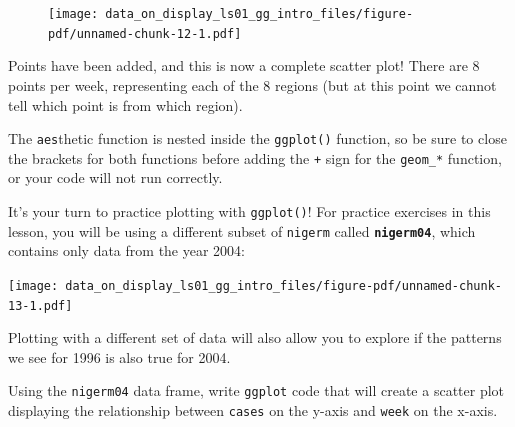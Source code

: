 \documentclass[
  letterpaper,
  DIV=11,
  numbers=noendperiod]{scrreprt}
\begin{document}
\begin{figure}[H]

{\centering \texttt{[image: data\_on\_display\_ls01\_gg\_intro\_files/figure-pdf/unnamed-chunk-12-1.pdf]}

}

\end{figure}

Points have been added, and this is now a complete scatter plot! There
are 8 points per week, representing each of the 8 regions (but at this
point we cannot tell which point is from which region).

\begin{tcolorbox}[enhanced jigsaw, colframe=quarto-callout-note-color-frame, rightrule=.15mm, opacityback=0, breakable, coltitle=black, colbacktitle=quarto-callout-note-color!10!white, bottomrule=.15mm, leftrule=.75mm, toprule=.15mm, arc=.35mm, bottomtitle=1mm, colback=white, left=2mm, opacitybacktitle=0.6, titlerule=0mm, title=\textcolor{quarto-callout-note-color}{\faInfo}\hspace{0.5em}{Reminder}, toptitle=1mm]

The \texttt{aes}thetic function is nested inside the \texttt{ggplot()}
function, so be sure to close the brackets for both functions before
adding the \texttt{+} sign for the \texttt{geom\_*} function, or your
code will not run correctly.

\end{tcolorbox}

It's your turn to practice plotting with \texttt{ggplot()}! For practice
exercises in this lesson, you will be using a different subset of
\texttt{nigerm} called \textbf{\texttt{nigerm04}}, which contains only
data from the year 2004:

\texttt{[image: data\_on\_display\_ls01\_gg\_intro\_files/figure-pdf/unnamed-chunk-13-1.pdf]}

Plotting with a different set of data will also allow you to explore if
the patterns we see for 1996 is also true for 2004.

\begin{tcolorbox}[enhanced jigsaw, colframe=quarto-callout-tip-color-frame, rightrule=.15mm, opacityback=0, breakable, coltitle=black, colbacktitle=quarto-callout-tip-color!10!white, bottomrule=.15mm, leftrule=.75mm, toprule=.15mm, arc=.35mm, bottomtitle=1mm, colback=white, left=2mm, opacitybacktitle=0.6, titlerule=0mm, title=\textcolor{quarto-callout-tip-color}{\faLightbulb}\hspace{0.5em}{Practice}, toptitle=1mm]

Using the \texttt{nigerm04} data frame, write \texttt{ggplot} code that
will create a scatter plot displaying the relationship between
\texttt{cases} on the y-axis and \texttt{week} on the x-axis.

\end{tcolorbox}
\end{document}
